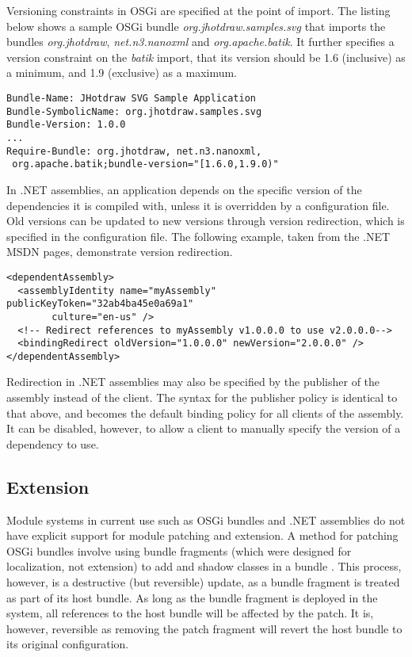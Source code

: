 Versioning constraints in OSGi are specified at the point of import. The
listing below shows a sample OSGi bundle \textit{org.jhotdraw.samples.svg}
that imports the bundles \textit{org.jhotdraw}, \textit{net.n3.nanoxml} and
\textit{org.apache.batik}. It further specifies a version constraint on
the \textit{batik} import, that its version should be 1.6 (inclusive) as
a minimum, and 1.9 (exclusive) as a maximum.

\begin{lstlisting}[caption=OSGi Bundle Version Constraints]
Bundle-Name: JHotdraw SVG Sample Application
Bundle-SymbolicName: org.jhotdraw.samples.svg
Bundle-Version: 1.0.0
...
Require-Bundle: org.jhotdraw, net.n3.nanoxml,
 org.apache.batik;bundle-version="[1.6.0,1.9.0)"
\end{lstlisting}

In .NET assemblies, an application depends on the specific version of the 
dependencies it is compiled with, unless it is overridden by a configuration
file. Old versions can be updated to new versions through version redirection,
which is specified in the configuration file. The following example, taken
from the .NET MSDN pages, demonstrate version redirection.

\begin{lstlisting}[caption=.NET Assemblies Version Redirection]
<dependentAssembly>
  <assemblyIdentity name="myAssembly" publicKeyToken="32ab4ba45e0a69a1" 
	   	culture="en-us" />
  <!-- Redirect references to myAssembly v1.0.0.0 to use v2.0.0.0-->
  <bindingRedirect oldVersion="1.0.0.0" newVersion="2.0.0.0" />
</dependentAssembly>
\end{lstlisting}

Redirection in .NET assemblies may also be specified by the publisher of the
assembly instead of the client. The syntax for the publisher policy is identical
to that above, and becomes the default binding policy for all clients of the assembly.
It can be disabled, however, to allow a client to manually specify the version of
a dependency to use.

\subsection{Extension}

Module systems in current use such as OSGi bundles and .NET assemblies do not 
have explicit support for module patching and extension. A method for patching OSGi bundles
involve using bundle fragments (which were designed for localization, not extension)
to add and shadow classes in a bundle \cite{patchingosgi}. This process, however, is
a destructive (but reversible) update, as a bundle fragment is treated as part of its 
host bundle. As long as the bundle fragment is deployed in the system, all references 
to the host bundle will be affected by the patch. It is, however, reversible as 
removing the patch fragment will revert the host bundle to its original configuration.

